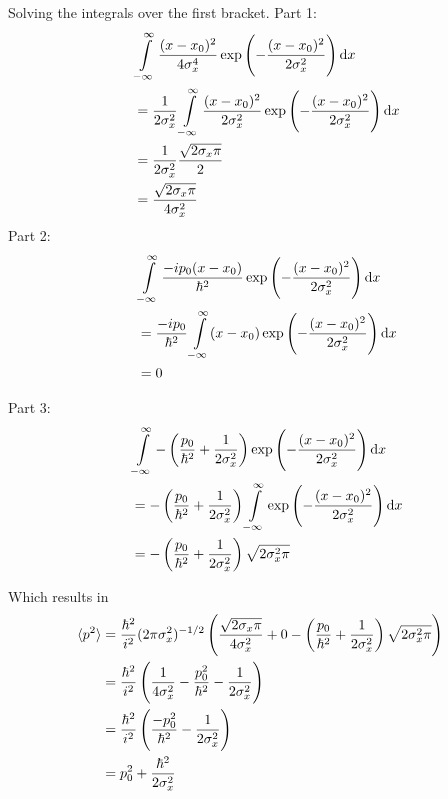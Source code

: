\documentclass[a4paper,german,12pt,smallheadings]{scrartcl}
\begin{document}
\begin{enumerate}[a)]
    Solving the integrals over the first bracket. Part 1:
    \begin{align*}
      \quad&\int\limits_{-\infty}^\infty
      \frac{(x-x_0)^2}{4\sigma_x^4}
      \exp\del{-\frac{(x-x_0)^2}{2\sigma_x^2}} \dif x \\
      &=
      \frac{1}{2\sigma_x^2} \int\limits_{-\infty}^\infty
      \frac{(x-x_0)^2}{2\sigma_x^2}
      \exp\del{-\frac{(x-x_0)^2}{2\sigma_x^2}} \dif x \\
      &=
      \frac{1}{2 \sigma_x^2} \frac{\sqrt{2 \sigma_x \pi}}{2} \\
      &= \frac{\sqrt{2 \sigma_x \pi}}{4 \sigma_x^2}
    \end{align*}
    Part 2:
    \begin{align*}
      \quad&\int\limits_{-\infty}^\infty
      \frac{-ip_0(x-x_0)}{\hbar^2}
      \exp\del{-\frac{(x-x_0)^2}{2\sigma_x^2}} \dif x \\
      &=
      \frac{-ip_0}{\hbar^2} \int\limits_{-\infty}^\infty
      (x-x_0)
      \exp\del{-\frac{(x-x_0)^2}{2\sigma_x^2}} \dif x \\
      &= 0
    \end{align*}

    Part 3:
    \begin{align*}
      \quad&\int\limits_{-\infty}^\infty
      -\del{\frac{p_0}{\hbar^2} + \frac{1}{2\sigma_x^2}}
      \exp\del{-\frac{(x-x_0)^2}{2\sigma_x^2}} \dif x \\
      &=
      -\del{\frac{p_0}{\hbar^2} + \frac{1}{2\sigma_x^2}}
      \int\limits_{-\infty}^\infty
      \exp\del{-\frac{(x-x_0)^2}{2\sigma_x^2}} \dif x \\
      &=
      -\del{\frac{p_0}{\hbar^2} + \frac{1}{2\sigma_x^2}}
      \sqrt{2 \sigma_x^2 \pi}
    \end{align*}

    Which results in
    \begin{align*}
      \braket{p^2} &= \frac{\hbar^2}{i^2}(2 \pi \sigma_x^2)^{-1/2} \del{
        \frac{\sqrt{2 \sigma_x \pi}}{4 \sigma_x^2} +
        0 -
        \del{\frac{p_0}{\hbar^2} + \frac{1}{2\sigma_x^2}} \sqrt{2 \sigma_x^2 \pi}
      } \\
      &=
      \frac{\hbar^2}{i^2} \del{\frac{1}{4\sigma_x^2} - \frac{p_0^2}{\hbar^2} - \frac{1}{2 \sigma_x^2}} \\
      &= \frac{\hbar^2}{i^2} \del{\frac{-p_0^2}{\hbar^2} - \frac{1}{2\sigma_x^2}} \\
      &= p_0^2 + \frac{\hbar^2}{2\sigma_x^2}
    \end{align*}


\end{enumerate}
\end{document}
